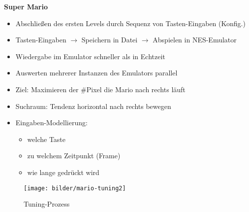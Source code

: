 \begin{frame}
  \textbf{Super Mario}
   
   \begin{itemize}
   
    \item Abschließen des ersten Levels durch Sequenz von Tasten-Eingaben (Konfig.)
    
    
    \item Tasten-Eingaben $\rightarrow$ Speichern in Datei $\rightarrow$ Abspielen in NES-Emulator
    
    \item Wiedergabe im Emulator schneller als in Echtzeit
    \item Auswerten mehrerer Instanzen des Emulators parallel
    
    \text{}
    
    \item Ziel: Maximieren der \#Pixel die Mario nach rechts läuft
    
    \item Suchraum: Tendenz horizontal nach rechts bewegen
    
    \item Eingaben-Modellierung:
      \begin{itemize}
        \item welche Taste
        \item zu welchem Zeitpunkt (Frame)
        \item wie lange gedrückt wird
      \end{itemize}
    \end{itemize}
   \end{frame}
\endgroup

 \begingroup
  \begin{frame}
  
  \begin{figure}
    \centering\texttt{[image: bilder/mario-tuning2]}
    \caption{Tuning-Prozess}
  \end{figure} 
  \end{frame}
  \endgroup
  
